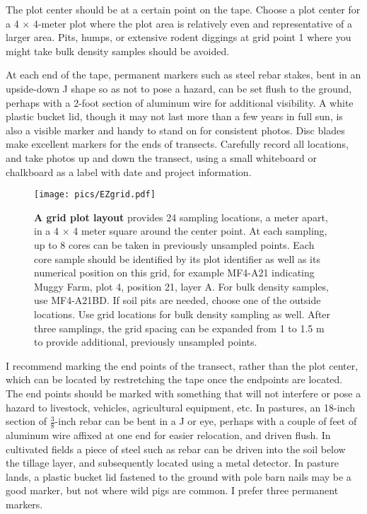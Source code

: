 \documentclass[11pt,letterpaper,oneside,onecolumn]{memoir}
\begin{document}
The plot center should be at a certain point on the tape. Choose a plot center for a 4 $\times$ 4-meter plot where the plot area is relatively even and representative of a larger area. Pits, humps, or extensive rodent diggings at grid point 1 where you might take bulk density samples should be avoided.

At each end of the tape, permanent markers such as steel rebar stakes, bent in an upside-down J shape so as not to pose a hazard, can be set flush to the ground, perhaps with a 2-foot section of aluminum wire for additional visibility. A white plastic bucket lid, though it may not last more than a few years in full sun, is also a visible marker and handy to stand on for consistent photos. Disc blades make excellent markers for the ends of transects. Carefully record all locations, and take photos up and down the transect, using a small whiteboard or chalkboard as a label with date and project information.

\begin{figure}
\centering
\texttt{[image: pics/EZgrid.pdf]}
\caption{\textbf{A grid plot layout} provides 24 sampling locations, a meter apart, in a 4 $\times$ 4 meter square around the center point. \label{EZgrid}At each sampling, up to 8 cores can be taken in previously unsampled points. Each core sample should be identified by its plot identifier as well as its numerical position on this grid, for example MF4-A21 indicating Muggy Farm, plot 4, position 21, layer A. For bulk density samples, use MF4-A21BD. If soil pits are needed, choose one of the outside locations. Use grid locations for bulk density sampling as well. After three samplings, the grid spacing can be expanded from 1 to 1.5 m to provide additional, previously unsampled points.}
\end{figure}

I recommend marking the end points of the transect, rather than the plot center, which can be located by restretching the tape once the endpoints are located. The end points should be marked with something that will not interfere or pose a hazard to livestock, vehicles, agricultural equipment, etc. In pastures, an 18-inch section of $\frac{3}{8}$-inch rebar can be bent in a J or eye, perhaps with a couple of feet of aluminum wire affixed at one end for easier relocation, and driven flush. In cultivated fields a piece of steel such as rebar can be driven into the soil below the tillage layer, and subsequently located using a metal detector. In pasture lands, a plastic bucket lid fastened to the ground with pole barn nails may be a good marker, but not where wild pigs are common. I prefer three permanent markers.
\end{document}
